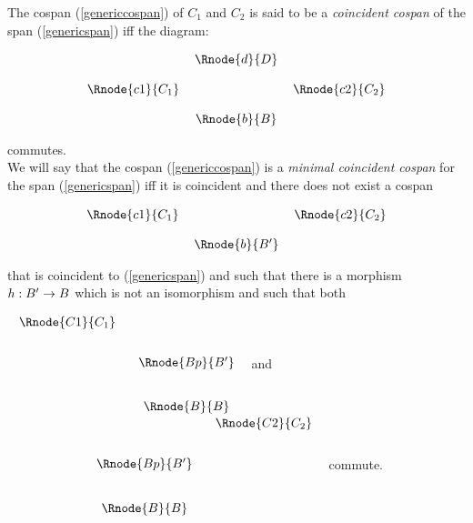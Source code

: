 \documentclass[10pt,a4paper]{scrartcl}
\begin{document}
\noindent
The cospan (\ref{genericcospan}) of $C_1$ and $C_2$ is said to be a 
\textit{coincident cospan} of the span (\ref{genericspan}) iff the 
diagram:
\begin{center}
\begin{equation}
\setlength{\arraycolsep}{3pt}
\begin{array}{cp{0cm}cp{0cm} c}
            & &\Rnode{d}{D}                           \\ [0.4cm]
\Rnode{c1}{C_1}& &                & & \Rnode{c2}{C_2} \\ [0.4cm]
            & &\Rnode{b}{B}
\end{array}
\end{equation}
\end{center}

\noindent commutes. \\

\noindent We will say that the cospan (\ref{genericcospan}) is a 
\textit{minimal coincident cospan} for the span (\ref{genericspan}) iff it is 
coincident  and there does not exist a cospan 
   
\begin{center}
\begin{equation}
\setlength{\arraycolsep}{3pt}
\begin{array}{c p{0cm}cp{0cm} c}
\Rnode{c1}{C_1}& &                & & \Rnode{c2}{C_2} \\ [0.4cm]
            & &\Rnode{b}{B'}      & &
\end{array}
\end{equation}
\end{center}

\noindent
that is coincident to (\ref{genericspan}) and such that there is a morphism 
$h: B' \rightarrow B$ which is not an isomorphism and such that both \\
\vspace {0.25cm}


$
\setlength{\arraycolsep}{9pt}
\begin{array}{c  c}
\setlength{\arraycolsep}{3pt}
\Rnode{C1}{C_1}                             \\ [0.7cm]
               & \Rnode{Bp}{B'}             \\ [0.8cm]
							 &  \Rnode{B}{B} 
\end{array}
$
and
$
\setlength{\arraycolsep}{9pt}
\begin{array}{p{1.5cm}cc}
&                &\Rnode{C2}{C_2}     \\ [0.7cm]
&\Rnode{Bp}{B'}                       \\ [0.8cm]
&\Rnode{B}{B}
\end{array}
$
commute. \\
\end{document}
